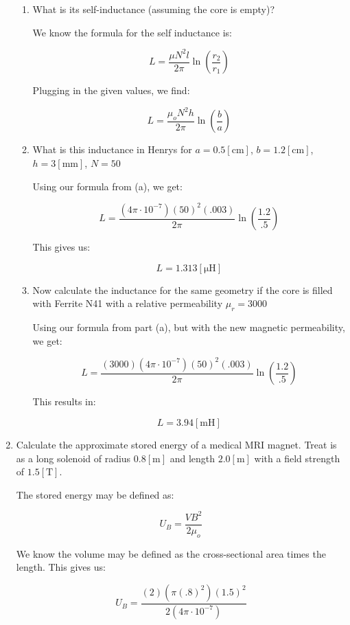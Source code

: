 \begin{enumerate}
    \begin{enumerate}

      \item What is its self-inductance (assuming the core is empty)?

        We know the formula for the self inductance is:

        $$L=\frac{\mu N^2l}{2\pi}\ln\left( \frac{r_2}{r_1} \right)$$

        Plugging in the given values, we find:

        $$\boxed{L=\frac{\mu_oN^2h}{2\pi}\ln\left( \frac{b}{a} \right)}$$

      \item What is this inductance in Henrys for $a=0.5[\si{\centi\meter}]$, $b=1.2[\si{\centi\meter}]$, $h=3[\si{\milli\meter}]$, $N=50$

        Using our formula from (a), we get:

        $$L=\frac{(4\pi\cdot10^{-7})(50)^2(.003)}{2\pi}\ln\left( \frac{1.2}{.5} \right)$$

        This gives us:

        $$\boxed{L=1.313\left[ \si{\micro\henry} \right]}$$

      \item Now calculate the inductance for the same geometry if the core is filled with Ferrite N41 with a relative permeability $\mu_r=3000$

        Using our formula from part (a), but with the new magnetic permeability, we get:

        $$L=\frac{(3000)(4\pi\cdot10^{-7})(50)^2(.003)}{2\pi}\ln\left( \frac{1.2}{.5} \right)$$

        This results in:

        $$\boxed{L=3.94[\si{\milli\henry}]}$$

    \end{enumerate}

  \item Calculate the approximate stored energy of a medical MRI magnet. Treat is as a long solenoid of radius $0.8[\si{\meter}]$ and length $2.0[\si{\meter}]$ with a field strength of $1.5[\si{\tesla}]$.
    
    The stored energy may be defined as:

    $$U_B=\frac{VB^2}{2\mu_o}$$

    We know the volume may be defined as the cross-sectional area times the length. This gives us:

    $$U_B=\frac{(2)(\pi(.8)^2)(1.5)^2}{2(4\pi\cdot10^{-7})}$$


\end{enumerate}
